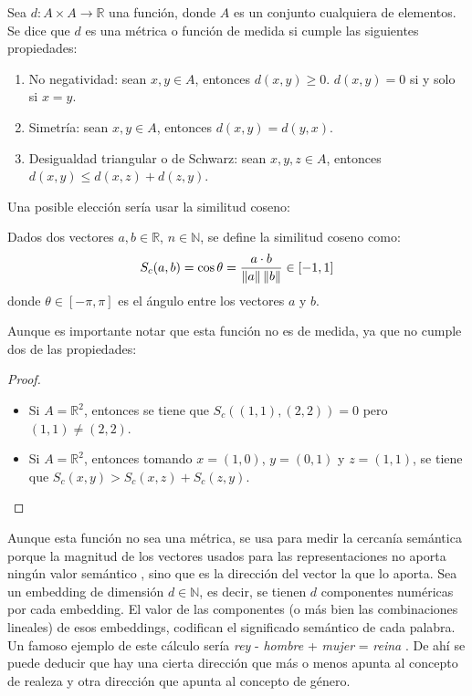 \begin{definition}
    Sea $d: A\times A \longrightarrow \mathbb{R}$ una función, donde $A$ es un conjunto cualquiera de elementos. Se dice que $d$ es una métrica o función
    de medida si cumple las siguientes propiedades:
    \begin{enumerate}
        \item No negatividad: sean $x,y\in A$, entonces $d(x,y)\geq 0$. $d(x,y)=0$ si y solo si $x=y$.
        \item Simetría: sean $x,y\in A$, entonces $d(x,y) = d(y,x)$.
        \item Desigualdad triangular o de Schwarz: sean $x,y,z\in A$, entonces $d(x,y) \leq d(x,z) + d(z,y)$.
    \end{enumerate}
\end{definition}

Una posible elección sería usar la similitud coseno:

\begin{definition}\label{def:similitud_coseno}
  Dados dos vectores $a,b\in\mathbb{R}$, $n\in\mathbb{N}$, se define la similitud coseno como:
  \[
    S_c(a,b)=\cos\theta = \frac{a\cdot b}{\left\lVert a\right\rVert\left\lVert b\right\rVert} \in [-1, 1]
  \]
donde $\theta\in[-\pi,\pi]$ es el ángulo entre los vectores $a$ y $b$.
\end{definition}

Aunque es importante notar que esta función no es de medida, ya que no cumple dos de las propiedades:
\begin{proof}
    $ $
    \begin{itemize}
    \item Si $A=\mathbb{R}^2$, entonces se tiene que $S_c\left( (1,1), (2,2) \right) = 0$ pero $(1,1)\neq (2,2)$.
    \item Si $A=\mathbb{R}^2$, entonces tomando $x=(1,0)$, $y=(0,1)$ y $z=(1,1)$, se tiene que $S_c\left( x, y \right) > S_c(x,z) + S_c(z,y)$.
    \end{itemize}
\end{proof}

Aunque esta función no sea una métrica, se usa para medir la cercanía semántica porque la magnitud de los vectores usados para las representaciones no aporta
ningún valor semántico \cite{landauer1997learning}, sino que es la dirección del vector la que lo aporta. Sea un embedding de dimensión $d\in\mathbb{N}$, es decir,
se tienen $d$ componentes numéricas por cada embedding. El valor de las componentes (o más bien las combinaciones lineales) de esos embeddings,
codifican el significado semántico de cada palabra. Un famoso ejemplo de este cálculo sería \emph{rey} - \emph{hombre} + \emph{mujer} = \emph{reina} \cite{drozd-etal-2016-word}.
De ahí se puede deducir que hay una cierta dirección que más o menos apunta al concepto de realeza y otra dirección que apunta al concepto de género.

